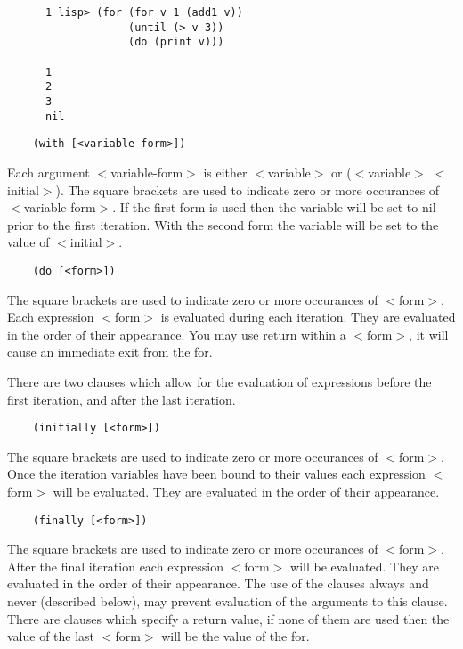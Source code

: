 \begin{verbatim}
      1 lisp> (for (for v 1 (add1 v))
                   (until (> v 3))
                   (do (print v)))

      1
      2
      3
      nil
\end{verbatim}

\begin{verbatim}
    (with [<variable-form>])
\end{verbatim}
      Each argument $<$variable-form$>$ is either $<$variable$>$ or
      ($<$variable$>$ $<$initial$>$). The square brackets are used to
						indicate
      zero or more occurances of $<$variable-form$>$.  If the first form is
      used then the variable will be set to nil prior to the first
      iteration.  With the second form the variable will be set to the
      value of $<$initial$>$.
 
\begin{verbatim}
    (do [<form>])
\end{verbatim}
      The square brackets are used to indicate zero or more occurances of
      $<$form$>$.  Each expression $<$form$>$ is evaluated during each
						iteration.
      They are evaluated in the order of their appearance.  You may use
      return within a $<$form$>$, it will cause an immediate exit from the
      for.

    There are two clauses which  allow  for  the  evaluation  of
    expressions  before  the first iteration, and after the last
    iteration.

\begin{verbatim}
    (initially [<form>])
\end{verbatim}
      The square brackets are used to indicate zero or more occurances of
      $<$form$>$. Once the iteration variables have been bound to their
						values each expression $<$form$>$ will be evaluated. They are
						evaluated in the order of their appearance.
						
\begin{verbatim}
    (finally [<form>])
\end{verbatim}

      The square brackets are used to indicate zero or more occurances of
      $<$form$>$.  After the final iteration each expression $<$form$>$ will
						be
      evaluated.  They are evaluated in the order of their appearance.  The
      use of the clauses always and never (described below), may
      prevent evaluation of the arguments to this clause.  There are clauses
      which specify a return value, if none of them are used then the value
      of the last $<$form$>$ will be the value of the for.


